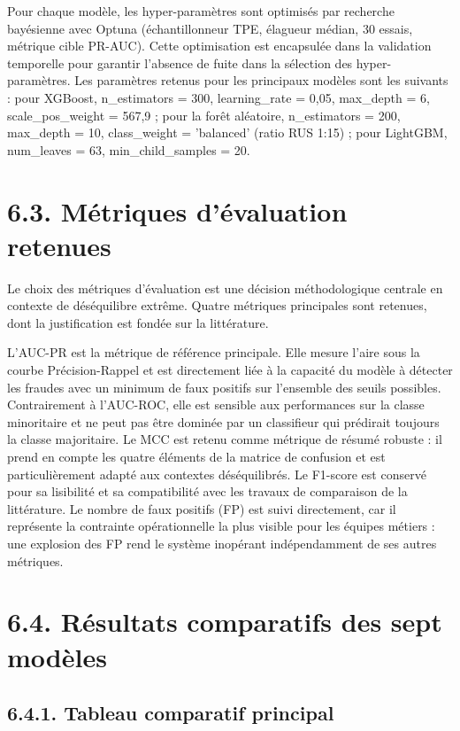 Pour chaque modèle, les hyper-paramètres sont optimisés par recherche bayésienne avec Optuna (échantillonneur TPE, élagueur médian, 30 essais, métrique cible PR-AUC). Cette optimisation est encapsulée dans la validation temporelle pour garantir l'absence de fuite dans la sélection des hyper-paramètres. Les paramètres retenus pour les principaux modèles sont les suivants : pour XGBoost, n\_estimators = 300, learning\_rate = 0,05, max\_depth = 6, scale\_pos\_weight = 567,9 ; pour la forêt aléatoire, n\_estimators = 200, max\_depth = 10, class\_weight = 'balanced' (ratio RUS 1:15) ; pour LightGBM, num\_leaves = 63, min\_child\_samples = 20.

\section{6.3. Métriques d'évaluation retenues}

Le choix des métriques d'évaluation est une décision méthodologique centrale en contexte de déséquilibre extrême. Quatre métriques principales sont retenues, dont la justification est fondée sur la littérature.

L'AUC-PR est la métrique de référence principale. Elle mesure l'aire sous la courbe Précision-Rappel et est directement liée à la capacité du modèle à détecter les fraudes avec un minimum de faux positifs sur l'ensemble des seuils possibles. Contrairement à l'AUC-ROC, elle est sensible aux performances sur la classe minoritaire et ne peut pas être dominée par un classifieur qui prédirait toujours la classe majoritaire. Le MCC est retenu comme métrique de résumé robuste : il prend en compte les quatre éléments de la matrice de confusion et est particulièrement adapté aux contextes déséquilibrés. Le F1-score est conservé pour sa lisibilité et sa compatibilité avec les travaux de comparaison de la littérature. Le nombre de faux positifs (FP) est suivi directement, car il représente la contrainte opérationnelle la plus visible pour les équipes métiers : une explosion des FP rend le système inopérant indépendamment de ses autres métriques.

\section{6.4. Résultats comparatifs des sept modèles}

\subsection{6.4.1. Tableau comparatif principal}

